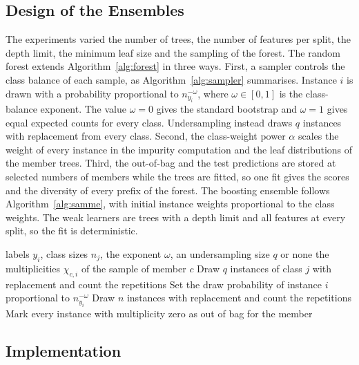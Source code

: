 \documentclass[10pt,conference]{IEEEtran}
\begin{document}
\subsection{Design of the Ensembles}
\label{sec:meth-design}

The experiments varied the number of trees, the number of features per split, the depth limit, the minimum leaf size and the sampling of the forest. The random forest extends Algorithm~\ref{alg:forest} in three ways. First, a sampler controls the class balance of each sample, as Algorithm~\ref{alg:sampler} summarises. Instance $i$ is drawn with a probability proportional to $n_{y_i}^{-\omega}$, where $\omega \in [0, 1]$ is the class-balance exponent. The value $\omega = 0$ gives the standard bootstrap and $\omega = 1$ gives equal expected counts for every class. Undersampling instead draws $q$ instances with replacement from every class. Second, the class-weight power $\alpha$ scales the weight of every instance in the impurity computation and the leaf distributions of the member trees. Third, the out-of-bag and the test predictions are stored at selected numbers of members while the trees are fitted, so one fit gives the scores and the diversity of every prefix of the forest. The boosting ensemble follows Algorithm~\ref{alg:samme}, with initial instance weights proportional to the class weights. The weak learners are trees with a depth limit and all features at every split, so the fit is deterministic.

\begin{algorithm}[b]
\caption{Class-balanced sample of one tree}
\label{alg:sampler}
\begin{algorithmic}[1]
\Require labels $y_i$, class sizes $n_j$, the exponent $\omega$, an undersampling size $q$ or none
\Ensure the multiplicities $\chi_{c,i}$ of the sample of member $c$
        \State Draw $q$ instances of class $j$ with replacement and count the repetitions
    \EndFor
\Else
    \State Set the draw probability of instance $i$ proportional to $n_{y_i}^{-\omega}$
    \State Draw $n$ instances with replacement and count the repetitions
\EndIf
\State Mark every instance with multiplicity zero as out of bag for the member
\end{algorithmic}
\end{algorithm}

\subsection{Implementation}
\label{sec:meth-impl}
\end{document}
